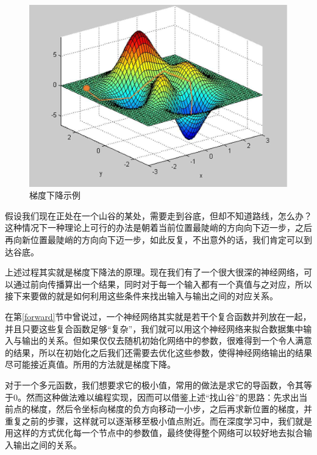 \documentclass[UTF8]{ctexart}
\begin{document}
    			\begin{figure}[H]
                    \centering
        			\includegraphics[scale=0.3]{gradient_descent.jpeg}
        			\caption{梯度下降示例\protect\footnotemark[1]}
        			\label{gradient_descent}
    		    \end{figure}
                
    			\indent 假设我们现在正处在一个山谷的某处，需要走到谷底，但却不知道路线，怎么办？这种情况下一种理论上可行的办法是朝着当前位置最陡峭的方向向下迈一步，之后再向新位置最陡峭的方向向下迈一步，如此反复，不出意外的话，我们肯定可以到达谷底。
    			
    			\indent 上述过程其实就是梯度下降法的原理。现在我们有了一个很大很深的神经网络，可以通过前向传播算出一个结果，同时对于每一个输入都有一个真值与之对应，所以接下来要做的就是如何利用这些条件来找出输入与输出之间的对应关系。
    			
    			\indent 在第\ref{forward}节中曾说过，一个神经网络其实就是若干个复合函数并列放在一起，并且只要这些复合函数足够“复杂”，我们就可以用这个神经网络来拟合数据集中输入与输出的关系。但如果仅仅去随机初始化网络中的参数，很难得到一个令人满意的结果，所以在初始化之后我们还需要去优化这些参数，使得神经网络输出的结果尽可能接近真值。所用的方法就是梯度下降。
    			
    			\indent 对于一个多元函数，我们想要求它的极小值，常用的做法是求它的导函数，令其等于0。然而这种做法难以编程实现，因而可以借鉴上述“找山谷”的思路：先求出当前点的梯度，然后令坐标向梯度的负方向移动一小步，之后再求新位置的梯度，并重复之前的步骤，这样就可以逐渐移至极小值点附近。而在深度学习中，我们就是用这样的方式优化每一个节点中的参数值，最终使得整个网络可以较好地去拟合输入输出之间的关系。
    			
\end{document}
